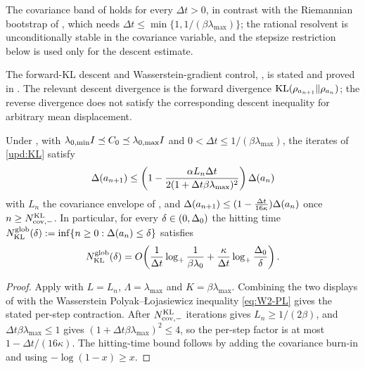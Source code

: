 The covariance band of  holds for every $\Delta t>0$, in contrast with
the Riemannian bootstrap of , which needs
$\Delta t\leq\min\{1,1/(\beta\lambda_{\max})\}$; the rational resolvent is unconditionally
stable in the covariance variable, and the stepsize restriction below is used only for the
descent estimate.

The forward-KL descent and Wasserstein-gradient control, , is stated
and proved in . The relevant descent divergence is the
forward divergence $\mathrm{KL}(\rho_{a_{n+1}}\|\rho_{a_n})$; the reverse divergence does not
satisfy the corresponding descent inequality for arbitrary mean displacement.

\begin{theorem}\label{thm:glob-KL}
    Under , with
    $\lambda_{0,\min}I\preceq C_0\preceq\lambda_{0,\max}I$ and
    $0<\Delta t\leq1/(\beta\lambda_{\max})$, the iterates of \eqref{upd:KL} satisfy
    \begin{equation*}
        \Delta(a_{n+1})
        \leq
        \left(1-\frac{\alpha L_n\Delta t}{2(1+\Delta t\beta\lambda_{\max})^2}\right)
        \Delta(a_n)
    \end{equation*}
    with $L_n$ the covariance envelope of , and
    $\Delta(a_{n+1})\leq(1-\tfrac{\Delta t}{16\kappa})\Delta(a_n)$ once
    $n\geq N_{\mathrm{cov},-}^{\mathrm{KL}}$. In particular, for every $\delta\in(0,\Delta_0)$ the hitting
    time $N_{\mathrm{KL}}^{\mathrm{glob}}(\delta):=\inf\{n\geq0:\Delta(a_n)\leq\delta\}$ satisfies
    \begin{equation*}
        N_{\mathrm{KL}}^{\mathrm{glob}}(\delta)
        =
        O\!\left(
            \frac1{\Delta t}\log_+\frac1{\beta\lambda_0}
            +\frac\kappa{\Delta t}\log_+\frac{\Delta_0}\delta
        \right).
    \end{equation*}
\end{theorem}

\begin{proof}
    Apply  with $L=L_n$, $\Lambda=\lambda_{\max}$ and
    $K=\beta\lambda_{\max}$. Combining the two displays of  with the
    Wasserstein Polyak--{\L}ojasiewicz inequality \eqref{eq:W2-PL} gives the stated per-step
    contraction. After $N_{\mathrm{cov},-}^{\mathrm{KL}}$ iterations  gives
    $L_n\geq1/(2\beta)$, and $\Delta t\beta\lambda_{\max}\leq1$ gives
    $(1+\Delta t\beta\lambda_{\max})^2\leq4$, so the per-step factor is at most
    $1-\Delta t/(16\kappa)$. The hitting-time bound follows by adding the covariance burn-in
    and using $-\log(1-x)\geq x$.
\end{proof}

